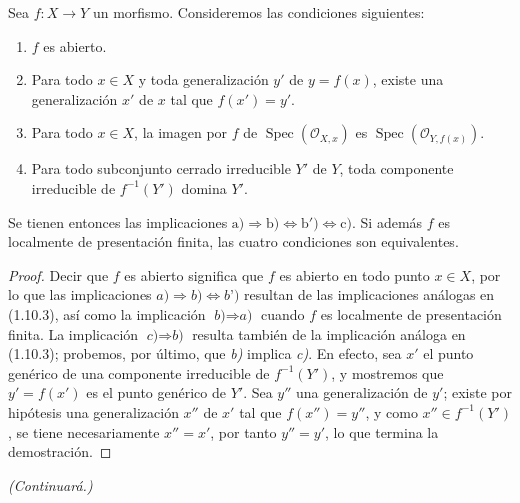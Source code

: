 \begin{corollary}[1.10.4]
\label{IV.1.10.4-fr}
Sea $f:X\to Y$ un morfismo. Consideremos las condiciones siguientes:
\begin{enumerate}
  \item[\textup{a)}] $f$ es abierto.
  \item[\textup{b)}] Para todo $x\in X$ y toda generalización $y'$ de $y=f(x)$,
  existe una generalización $x'$ de $x$ tal que $f(x')=y'$.
  \item[\textup{b')}] Para todo $x\in X$, la imagen por $f$ de
  $\operatorname{Spec}(\mathcal O_{X,x})$ es
  $\operatorname{Spec}(\mathcal O_{Y,f(x)})$.
  \item[\textup{c)}] Para todo subconjunto cerrado irreducible $Y'$ de $Y$, toda
  componente irreducible de $f^{-1}(Y')$ domina $Y'$.
\end{enumerate}
Se tienen entonces las implicaciones
$\mathrm{a)}\Rightarrow\mathrm{b)}\Leftrightarrow\mathrm{b')}
\Leftrightarrow\mathrm{c)}$. Si además $f$ es localmente de presentación
finita, las cuatro condiciones son equivalentes.
\end{corollary}

\begin{proof}
Decir que $f$ es abierto significa que $f$ es abierto en todo punto $x\in X$,
por lo que las implicaciones
$\textit{a)}\Rightarrow\textit{b)}\Leftrightarrow\textit{b')}$ resultan de las
implicaciones análogas en (1.10.3), así como la implicación
$\textit{b)}\Rightarrow\textit{a)}$ cuando $f$ es localmente de presentación
finita. La implicación $\textit{c)}\Rightarrow\textit{b)}$ resulta también de
la implicación análoga en (1.10.3); probemos, por último, que \emph{b)} implica \emph{c)}. En
efecto, sea $x'$ el punto genérico de una componente
irreducible de $f^{-1}(Y')$, y mostremos que $y'=f(x')$ es el punto genérico
de $Y'$. Sea $y''$ una generalización de $y'$; existe por hipótesis una
generalización $x''$ de $x'$ tal que $f(x'')=y''$, y como
$x''\in f^{-1}(Y')$, se tiene necesariamente $x''=x'$, por tanto $y''=y'$, lo que
termina la demostración.
\end{proof}

\begin{center}
\emph{(Continuará.)}
\end{center}

